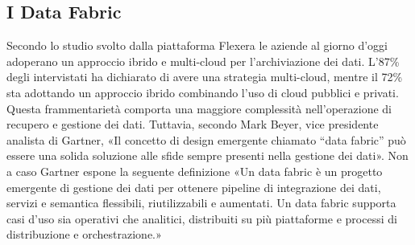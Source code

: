 \subsection{I Data Fabric}
Secondo lo studio svolto dalla piattaforma Flexera\cite{flexera_cloud_computing} le aziende al giorno d’oggi adoperano un approccio ibrido e multi-cloud per l’archiviazione dei dati. L’87\% degli intervistati ha dichiarato di avere una strategia multi-cloud, mentre il 72\% sta adottando un approccio ibrido combinando l’uso di cloud pubblici e privati. Questa frammentarietà comporta una maggiore complessità nell’operazione di recupero e gestione dei dati. Tuttavia, secondo Mark Beyer, vice presidente analista di Gartner, «Il concetto di design emergente chiamato “data fabric” può essere una solida soluzione alle sfide sempre presenti nella gestione dei dati».\cite{gartner_data_fabric_architecture}
Non a caso Gartner espone la seguente definizione «Un data fabric è un progetto emergente di gestione dei dati per ottenere pipeline di integrazione dei dati, servizi e semantica flessibili, riutilizzabili e aumentati. Un data fabric supporta casi d'uso sia operativi che analitici, distribuiti su più piattaforme e processi di distribuzione e orchestrazione.»\cite{gartner_data_fabric}

